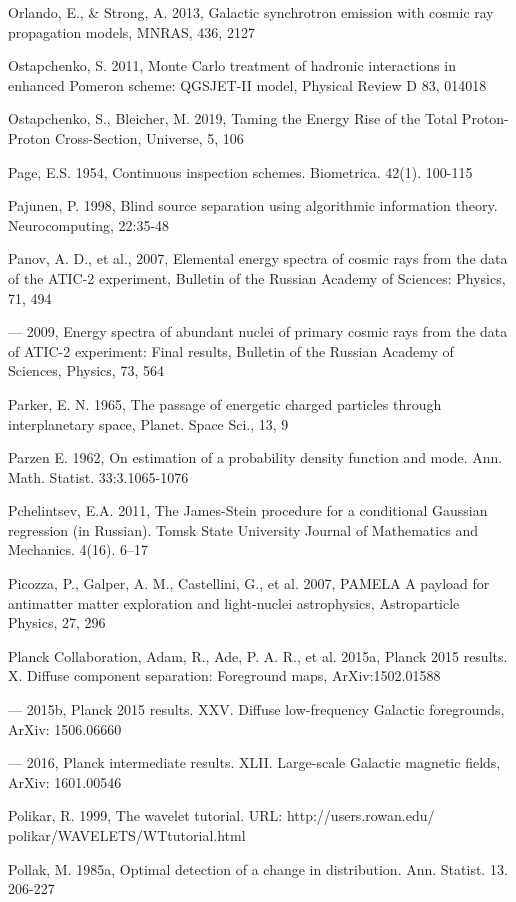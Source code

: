 Orlando, E., \& Strong, A. 2013, Galactic synchrotron emission with cosmic ray propagation models, MNRAS, 436, 2127

Ostapchenko, S. 2011, Monte Carlo treatment of hadronic interactions in enhanced Pomeron scheme: QGSJET-II model, Physical Review D 83, 014018

Ostapchenko, S., Bleicher, M. 2019, Taming the Energy Rise of the Total Proton-Proton Cross-Section, Universe, 5, 106

Page, E.S. 1954, Continuous inspection schemes. Biometrica. 42(1). 100-115

Pajunen, P. 1998, Blind source separation using algorithmic information theory. Neurocomputing, 22:35-48

Panov, A. D., et al., 2007, Elemental energy spectra of cosmic rays from the data of the ATIC-2 experiment, Bulletin of the Russian Academy of Sciences: Physics, 71, 494

--- 2009, Energy spectra of abundant nuclei of primary cosmic rays from the data of ATIC-2 experiment: Final results, Bulletin of the Russian Academy of Sciences, Physics, 73, 564

Parker, E. N. 1965, The passage of energetic charged particles through interplanetary space, Planet. Space Sci., 13, 9

Parzen E. 1962, On estimation of a probability density function and mode. Ann. Math. Statist. 33:3.1065-1076

Pchelintsev, E.A. 2011, The James-Stein procedure for a conditional Gaussian regression (in Russian). Tomsk State University Journal of Mathematics and Mechanics. 4(16). 6--17

Picozza, P., Galper, A. M., Castellini, G., et al. 2007, PAMELA A payload for antimatter matter exploration and light-nuclei astrophysics, Astroparticle Physics, 27, 296

Planck Collaboration, Adam, R., Ade, P. A. R., et al. 2015a, Planck 2015 results. X. Diffuse component separation: Foreground maps, ArXiv:1502.01588

--- 2015b, Planck 2015 results. XXV. Diffuse low-frequency Galactic foregrounds, ArXiv: 1506.06660

--- 2016, Planck intermediate results. XLII. Large-scale Galactic magnetic fields, ArXiv: 1601.00546

Polikar, R. 1999, The wavelet tutorial. URL: http://users.rowan.edu/ polikar/WAVELETS/WTtutorial.html

Pollak, M. 1985a, Optimal detection of a change in distribution. Ann. Statist. 13. 206-227

